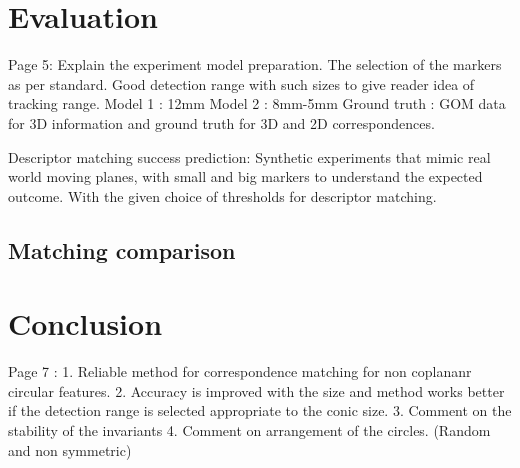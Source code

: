 \documentclass{bmvc2k}
\begin{document}
\section{Evaluation}
Page 5: 
Explain the experiment model preparation. The selection of the markers as per standard. Good detection range with such sizes to give reader idea of tracking range. 
Model 1 : 12mm 
Model 2 : 8mm-5mm 
Ground truth : GOM data for 3D information and ground truth for 3D and 2D correspondences. 

Descriptor matching success prediction: Synthetic experiments that mimic real world moving planes, with small and big markers to understand the expected outcome. With the given choice of thresholds for descriptor matching. 

\subsection{Matching comparison}
%
%
%
%
%
%
%
%

\section{Conclusion}
Page 7 : 
1. Reliable method for correspondence matching for non coplananr circular features. 
2. Accuracy is improved with the size and method works better if the detection range is selected appropriate to the conic size. 
3. Comment on the stability of the invariants 
4. Comment on arrangement of the circles. (Random and non symmetric)
\end{document}
